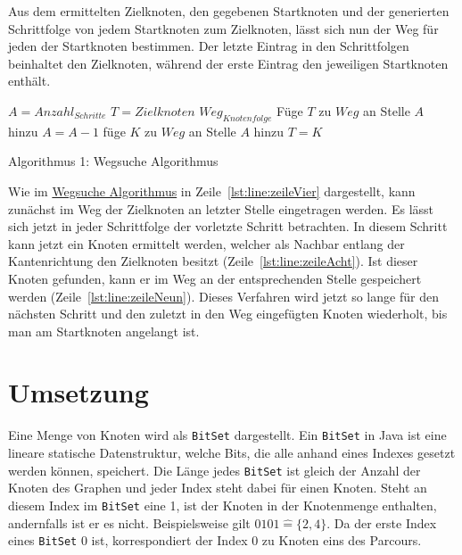 \documentclass[a4paper,10pt,ngerman]{scrartcl}
\begin{document}
    Aus dem ermittelten Zielknoten, den gegebenen Startknoten und der generierten Schrittfolge von jedem Startknoten zum Zielknoten,
    lässt sich nun der Weg für jeden der Startknoten bestimmen.
    Der letzte Eintrag in den Schrittfolgen beinhaltet den Zielknoten,
    während der erste Eintrag den jeweiligen Startknoten enthält.

    \begin{algorithm}
        \begin{algorithmic}[1]
            \State $A = Anzahl_{Schritte}$
            \State $T = Zielknoten$
            \State $Weg_{Knotenfolge}$
            \State Füge $T$ zu $Weg$ an Stelle $A$ hinzu \label{lst:line:zeileVier}
                \State $A = A -1$
                        \label{lst:line:zeileAcht}
                        \State füge $K$ zu $Weg$ an Stelle $A$ hinzu \label{lst:line:zeileNeun}
                        \State $T = K$
                    \EndIf
                \EndFor
            \EndFor
        \end{algorithmic}
        \caption{Algorithmus 1: Wegsuche Algorithmus}
        \label{alg:Algorithm1}
    \end{algorithm}

    Wie im \hyperref[alg:Algorithm1]{Wegsuche Algorithmus} in Zeile~\ref{lst:line:zeileVier} dargestellt,
    kann zunächst im Weg der Zielknoten an letzter Stelle eingetragen werden.
    Es lässt sich jetzt in jeder Schrittfolge der vorletzte Schritt betrachten.
    In diesem Schritt kann jetzt ein Knoten ermittelt werden,
    welcher als Nachbar entlang der Kantenrichtung den Zielknoten besitzt (Zeile~\ref{lst:line:zeileAcht}).
    Ist dieser Knoten gefunden,
    kann er im Weg an der entsprechenden Stelle gespeichert werden (Zeile~\ref{lst:line:zeileNeun}).
    Dieses Verfahren wird jetzt so lange für den nächsten Schritt und den zuletzt in den Weg eingefügten Knoten wiederholt,
    bis man am Startknoten angelangt ist.


    \section{Umsetzung}\label{sec:umsetzung}

    Eine Menge von Knoten wird als \texttt{BitSet} dargestellt.
    Ein \texttt{BitSet} in Java ist eine lineare statische Datenstruktur,
    welche Bits, die alle anhand eines Indexes gesetzt werden können,
    speichert.
    Die Länge jedes \texttt{BitSet} ist gleich der Anzahl der Knoten des Graphen
    und jeder Index steht dabei für einen Knoten.
    Steht an diesem Index im \texttt{BitSet} eine 1,
    ist der Knoten in der Knotenmenge enthalten,
    andernfalls ist er es nicht.
    Beispielsweise gilt $0101 \widehat{=} \{2, 4\}$.
    Da der erste Index eines \texttt{BitSet} 0 ist,
    korrespondiert der Index 0 zu Knoten eins des Parcours.
\end{document}
